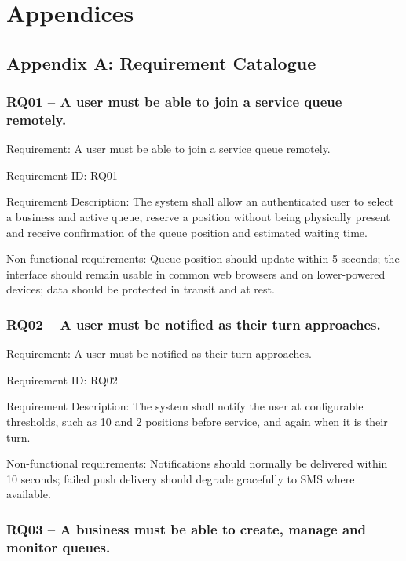\documentclass[
]{article}
\begin{document}
\section{Appendices}\label{appendices}

\subsection{Appendix A: Requirement
Catalogue}\label{appendix-a-requirement-catalogue}

\subsubsection{RQ01 -- A user must be able to join a service queue
remotely.}\label{rq01-a-user-must-be-able-to-join-a-service-queue-remotely.}

Requirement: A user must be able to join a service queue remotely.

Requirement ID: RQ01

Requirement Description: The system shall allow an authenticated user to
select a business and active queue, reserve a position without being
physically present and receive confirmation of the queue position and
estimated waiting time.

Non-functional requirements: Queue position should update within 5
seconds; the interface should remain usable in common web browsers and
on lower-powered devices; data should be protected in transit and at
rest.

\subsubsection{RQ02 -- A user must be notified as their turn
approaches.}\label{rq02-a-user-must-be-notified-as-their-turn-approaches.}

Requirement: A user must be notified as their turn approaches.

Requirement ID: RQ02

Requirement Description: The system shall notify the user at
configurable thresholds, such as 10 and 2 positions before service, and
again when it is their turn.

Non-functional requirements: Notifications should normally be delivered
within 10 seconds; failed push delivery should degrade gracefully to SMS
where available.

\subsubsection{RQ03 -- A business must be able to create, manage and
monitor
queues.}\label{rq03-a-business-must-be-able-to-create-manage-and-monitor-queues.}
\end{document}
